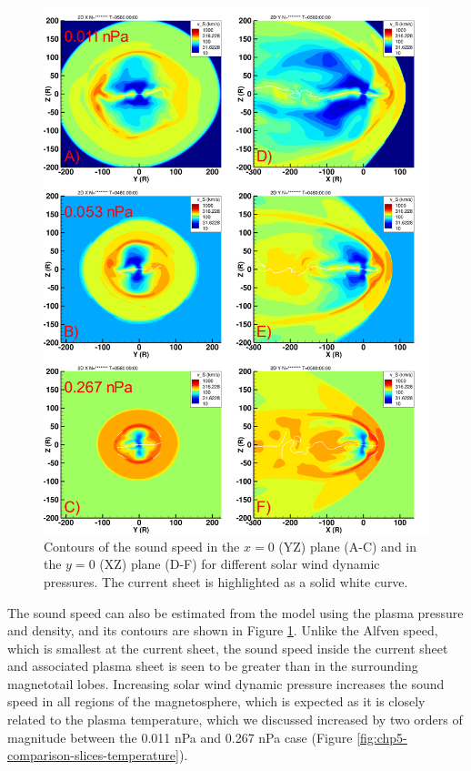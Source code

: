 \begin{figure}
    \centering
    \includegraphics[height=0.9\textheight]{images5/compare_runs_currentsheet_SoundSpeed.png}
    \caption{Contours of the sound speed in the $x=0$ (YZ) plane (A-C) and in the $y=0$ (XZ) plane (D-F) for different solar wind dynamic pressures. The current sheet is highlighted as a solid white curve.}
    \label{fig:chp5-comparison-slices-sound}
\end{figure}

The sound speed can also be estimated from the model using the plasma pressure and density, and its contours are shown in Figure \ref{fig:chp5-comparison-slices-sound}. Unlike the Alfven speed, which is smallest at the current sheet, the sound speed inside the current sheet and associated plasma sheet is seen to be greater than in the surrounding magnetotail lobes. Increasing solar wind dynamic pressure increases the sound speed in all regions of the magnetosphere, which is expected as it is closely related to the plasma temperature, which we discussed increased by two orders of magnitude between the 0.011 nPa and 0.267 nPa case (Figure \ref{fig:chp5-comparison-slices-temperature}). 

